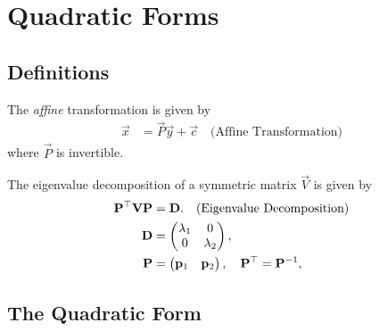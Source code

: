 \documentclass[journal,12pt,onecolumn]{IEEEtran}
\begin{document}
\section{Quadratic Forms}
\subsection{Definitions}
\begin{definition}
	The {\em affine} transformation is given by 
    \begin{align}
	    \vec{x} &= \vec{P}\vec{y}+\vec{c} \quad \text{(Affine Transformation)}
\label{eq:conic_affine}
    \end{align}
	where $\vec{P}$ is invertible.
\end{definition}
\begin{definition}
	The eigenvalue decomposition of a symmetric matrix $\vec{V}$ is given by 
    \begin{align}
      \label{eq:conic_parmas_eig_def}
      \mathbf{P}^{\top}\mathbf{V}\mathbf{P} &= \mathbf{D}. \quad \text{(Eigenvalue Decomposition)}
      \\
      \mathbf{D} &= \begin{pmatrix}\lambda_1 & 0\\ 0 & \lambda_2\end{pmatrix}, 
      \\
      \mathbf{P} &= \begin{pmatrix}\mathbf{p}_1 & \mathbf{p}_2\end{pmatrix}, \quad \mathbf{P}^{\top}=\mathbf{P}^{-1},
      \label{eq:eigevecP}
    \end{align}
\end{definition}
\subsection{The Quadratic Form}
\end{document}

